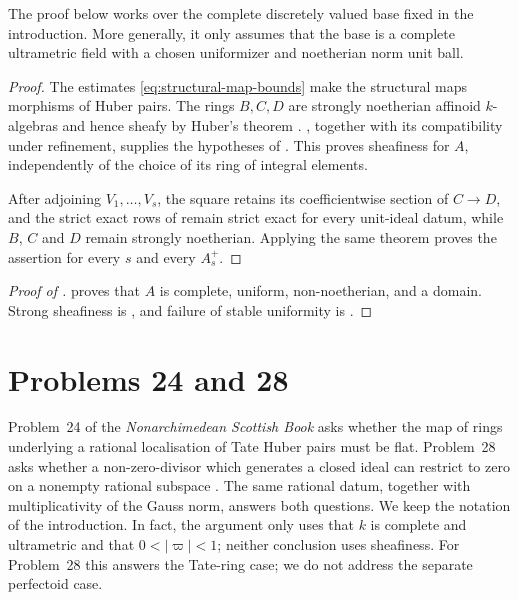 \documentclass[11pt,reqno]{amsart}
\theoremstyle{definition}
\begin{document}
The proof below works over the complete discretely valued base fixed in the
introduction.  More generally, it only assumes that the base is a complete
ultrametric field with a chosen uniformizer and noetherian norm unit ball.

\begin{proof}
The estimates \eqref{eq:structural-map-bounds} make the structural maps
morphisms of Huber pairs.  The rings $B,C,D$ are strongly noetherian affinoid
$k$-algebras and hence sheafy by Huber's theorem
\cite[Theorem~2.2]{Huber94}.  , together
with its compatibility under refinement, supplies the hypotheses of
.  This proves sheafiness for $A$, independently
of the choice of its ring of integral elements.

After adjoining $V_1,\ldots,V_s$, the square retains its coefficientwise
section of $C\to D$, and the strict exact rows of
 remain strict exact for every unit-ideal datum,
while $B$, $C$ and $D$ remain strongly noetherian.  Applying the same theorem
proves the assertion for every $s$ and every $A_s^+$.
\end{proof}

\begin{proof}[Proof of ]
 proves that $A$ is complete, uniform,
non-noetherian, and a domain.  Strong sheafiness is , and
failure of stable uniformity is .
\end{proof}


\section{Problems 24 and 28}\label{sec:problems-24-28}

Problem~24 of the \emph{Nonarchimedean Scottish Book} asks whether the map of
rings underlying a rational localisation of Tate Huber pairs must be flat.
Problem~28 asks whether a non-zero-divisor which generates a closed ideal can
restrict to zero on a nonempty rational subspace \cite[Problems~24 and 28]{Scottish}.
The same rational datum, together with multiplicativity of the Gauss norm,
answers both questions.  We keep the notation of the introduction.  In fact,
the argument only uses that $k$ is complete and ultrametric and that
$0<|\varpi|<1$; neither conclusion uses sheafiness.  For Problem~28 this
answers the Tate-ring case; we do not address the separate perfectoid case.
\end{document}
